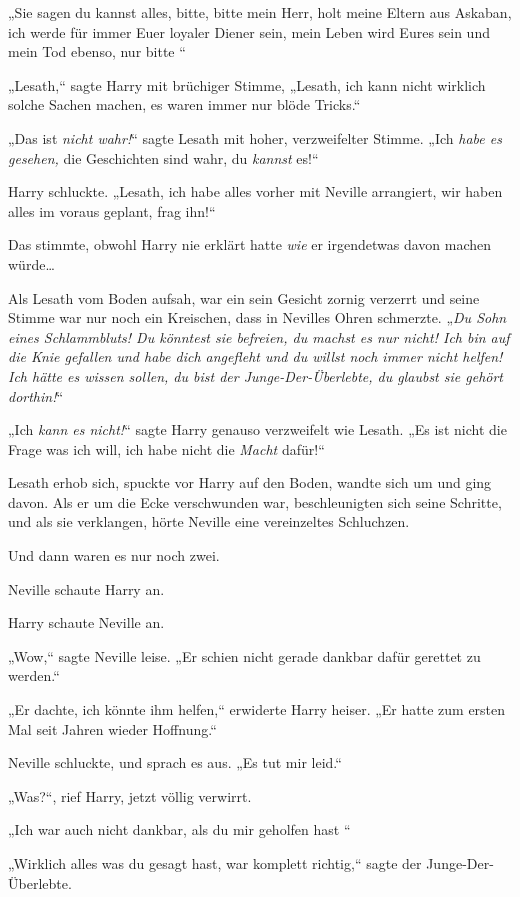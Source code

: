 {„Sie sagen du kannst alles, bitte, bitte mein Herr, holt meine Eltern aus Askaban, ich werde für immer Euer loyaler Diener sein, mein Leben wird Eures sein und mein Tod ebenso, nur bitte \later“

„Lesath,“ sagte Harry mit brüchiger Stimme, „Lesath, ich kann nicht wirklich solche Sachen machen, es waren immer nur blöde Tricks.“

„Das ist \emph{nicht wahr!}“ sagte Lesath mit hoher, verzweifelter Stimme. „Ich \emph{habe es gesehen,} die Geschichten sind wahr, du \emph{kannst} es!“

Harry schluckte. „Lesath, ich habe alles vorher mit Neville arrangiert, wir haben alles im voraus geplant, frag ihn!“

Das stimmte, obwohl Harry nie erklärt hatte \emph{wie} er irgendetwas davon machen würde…

Als Lesath vom Boden aufsah, war ein sein Gesicht zornig verzerrt und seine Stimme war nur noch ein Kreischen, dass in Nevilles Ohren schmerzte. „\emph{Du Sohn eines Schlammbluts! Du könntest sie befreien, du machst es nur nicht! Ich bin auf die Knie gefallen und habe dich angefleht und du willst noch immer nicht helfen! Ich hätte es wissen sollen, du bist der Junge-Der-Überlebte, du glaubst sie gehört} \emph{dorthin!}“

„Ich \emph{kann es nicht!}“ sagte Harry genauso verzweifelt wie Lesath. „Es ist nicht die Frage was ich will, ich habe nicht die \emph{Macht} dafür!“

Lesath erhob sich, spuckte vor Harry auf den Boden, wandte sich um und ging davon. Als er um die Ecke verschwunden war, beschleunigten sich seine Schritte, und als sie verklangen, hörte Neville eine vereinzeltes Schluchzen.

Und dann waren es nur noch zwei.

Neville schaute Harry an.

Harry schaute Neville an.

„Wow,“ sagte Neville leise. „Er schien nicht gerade dankbar dafür gerettet zu werden.“

„Er dachte, ich könnte ihm helfen,“ erwiderte Harry heiser. „Er hatte zum ersten Mal seit Jahren wieder Hoffnung.“

Neville schluckte, und sprach es aus. „Es tut mir leid.“

„Was?“, rief Harry, jetzt völlig verwirrt.

„Ich war auch nicht dankbar, als du mir geholfen hast \later“

„Wirklich alles was du gesagt hast, war komplett richtig,“ sagte der Junge-Der-Überlebte.

}
